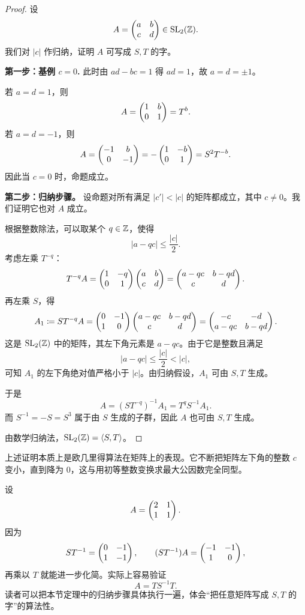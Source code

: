 \begin{proof}
设
\[
A=\begin{pmatrix} a&b\\ c&d \end{pmatrix}\in \mathrm{SL}_2(\mathbb{Z}).
\]
我们对 $|c|$ 作归纳，证明 $A$ 可写成 $S,T$ 的字。

\medskip
\noindent\textbf{第一步：基例 $c=0$.}
此时由 $ad-bc=1$ 得 $ad=1$，故 $a=d=\pm 1$。

若 $a=d=1$，则
\[
A=\begin{pmatrix} 1&b\\ 0&1 \end{pmatrix}=T^b.
\]
若 $a=d=-1$，则
\[
A=\begin{pmatrix} -1&b\\ 0&-1 \end{pmatrix}=-\begin{pmatrix} 1&-b\\ 0&1 \end{pmatrix}=S^2T^{-b}.
\]
因此当 $c=0$ 时，命题成立。

\medskip
\noindent\textbf{第二步：归纳步骤。}
设命题对所有满足 $|c'|<|c|$ 的矩阵都成立，其中 $c\ne 0$。我们证明它也对 $A$ 成立。

根据整数除法，可以取某个 $q\in\mathbb{Z}$，使得
\[
|a-qc|\le \frac{|c|}{2}.
\]
考虑左乘 $T^{-q}$：
\[
T^{-q}A=
\begin{pmatrix} 1&-q\\ 0&1 \end{pmatrix}
\begin{pmatrix} a&b\\ c&d \end{pmatrix}
=
\begin{pmatrix} a-qc&b-qd\\ c&d \end{pmatrix}.
\]
再左乘 $S$，得
\[
A_1\coloneqq ST^{-q}A
=
\begin{pmatrix} 0&-1\\ 1&0 \end{pmatrix}
\begin{pmatrix} a-qc&b-qd\\ c&d \end{pmatrix}
=
\begin{pmatrix} -c&-d\\ a-qc&b-qd \end{pmatrix}.
\]
这是 $\mathrm{SL}_2(\mathbb{Z})$ 中的矩阵，其左下角元素是 $a-qc$。由于它是整数且满足
\[
|a-qc|\le \frac{|c|}{2}<|c|,
\]
可知 $A_1$ 的左下角绝对值严格小于 $|c|$。由归纳假设，$A_1$ 可由 $S,T$ 生成。

于是
\[
A=(ST^{-q})^{-1}A_1=T^qS^{-1}A_1.
\]
而 $S^{-1}=-S=S^3$ 属于由 $S$ 生成的子群，因此 $A$ 也可由 $S,T$ 生成。

由数学归纳法，$\mathrm{SL}_2(\mathbb{Z})=\langle S,T\rangle$。
\end{proof}

\begin{remark}
上述证明本质上是欧几里得算法在矩阵上的表现。它不断把矩阵左下角的整数 $c$ 变小，直到降为 $0$，这与用初等整数变换求最大公因数完全同型。
\end{remark}

\begin{example}
设
\[
A=\begin{pmatrix} 2&1\\ 1&1 \end{pmatrix}.
\]
因为
\[
ST^{-1}=
\begin{pmatrix} 0&-1\\ 1&-1 \end{pmatrix},
\qquad
(ST^{-1})A=
\begin{pmatrix} -1&-1\\ 1&0 \end{pmatrix},
\]
再乘以 $T$ 就能进一步化简。实际上容易验证
\[
A=TS^{-1}T.
\]
读者可以把本节定理中的归纳步骤具体执行一遍，体会“把任意矩阵写成 $S,T$ 的字”的算法性。
\end{example}

